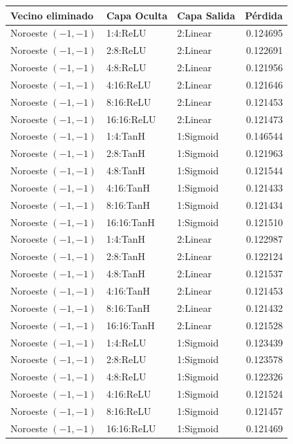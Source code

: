 \begin{table}[h]
	\centering
	\begin{tabular}{lllr}
		\toprule
		\textbf{Vecino eliminado} & \textbf{Capa Oculta} & \textbf{Capa Salida} & \textbf{Pérdida} \\
		\midrule
		Noroeste $(-1,-1)$ & 1:4:ReLU & 2:Linear & 0.124695 \\
		Noroeste $(-1,-1)$ & 2:8:ReLU & 2:Linear & 0.122691 \\
		Noroeste $(-1,-1)$ & 4:8:ReLU & 2:Linear & 0.121956 \\
		Noroeste $(-1,-1)$ & 4:16:ReLU & 2:Linear & 0.121646 \\
		Noroeste $(-1,-1)$ & 8:16:ReLU & 2:Linear & 0.121453 \\
		Noroeste $(-1,-1)$ & 16:16:ReLU & 2:Linear & 0.121473 \\
		Noroeste $(-1,-1)$ & 1:4:TanH & 1:Sigmoid & 0.146544 \\
		Noroeste $(-1,-1)$ & 2:8:TanH & 1:Sigmoid & 0.121963 \\
		Noroeste $(-1,-1)$ & 4:8:TanH & 1:Sigmoid & 0.121544 \\
		Noroeste $(-1,-1)$ & 4:16:TanH & 1:Sigmoid & 0.121433 \\
		Noroeste $(-1,-1)$ & 8:16:TanH & 1:Sigmoid & 0.121434 \\
		Noroeste $(-1,-1)$ & 16:16:TanH & 1:Sigmoid & 0.121510 \\
		Noroeste $(-1,-1)$ & 1:4:TanH & 2:Linear & 0.122987 \\
		Noroeste $(-1,-1)$ & 2:8:TanH & 2:Linear & 0.122124 \\
		Noroeste $(-1,-1)$ & 4:8:TanH & 2:Linear & 0.121537 \\
		Noroeste $(-1,-1)$ & 4:16:TanH & 2:Linear & 0.121453 \\
		Noroeste $(-1,-1)$ & 8:16:TanH & 2:Linear & 0.121432 \\
		Noroeste $(-1,-1)$ & 16:16:TanH & 2:Linear & 0.121528 \\
		Noroeste $(-1,-1)$ & 1:4:ReLU & 1:Sigmoid & 0.123439 \\
		Noroeste $(-1,-1)$ & 2:8:ReLU & 1:Sigmoid & 0.123578 \\
		Noroeste $(-1,-1)$ & 4:8:ReLU & 1:Sigmoid & 0.122326 \\
		Noroeste $(-1,-1)$ & 4:16:ReLU & 1:Sigmoid & 0.121524 \\
		Noroeste $(-1,-1)$ & 8:16:ReLU & 1:Sigmoid & 0.121457 \\
		Noroeste $(-1,-1)$ & 16:16:ReLU & 1:Sigmoid & 0.121469 \\

\end{tabular}
\end{table}
